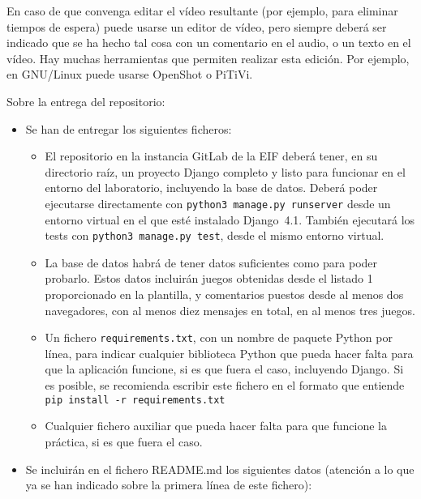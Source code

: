 \begin{enumerate}
En caso de que convenga editar el vídeo resultante (por ejemplo, para eliminar tiempos de espera) puede usarse un editor de vídeo, pero siempre deberá ser indicado que se ha hecho tal cosa con un comentario en el audio, o un texto en el vídeo. Hay muchas herramientas que permiten realizar esta edición. Por ejemplo, en GNU/Linux puede usarse OpenShot o PiTiVi.

\end{enumerate}

Sobre la entrega del repositorio:
\begin{itemize}
  \item Se han de entregar los siguientes ficheros:

\begin{itemize}
\item El repositorio en la instancia GitLab de la EIF deberá tener, en su directorio raíz, un proyecto Django completo y listo para funcionar en el entorno del laboratorio, incluyendo la base de datos. Deberá poder ejecutarse directamente con \verb|python3 manage.py runserver| desde un entorno virtual en el que esté instalado Django~4.1. También ejecutará los tests con \verb|python3 manage.py test|, desde el mismo entorno virtual.

\item La base de datos habrá de tener datos suficientes como para poder probarlo. Estos datos incluirán juegos obtenidas desde el listado 1 proporcionado en la plantilla, y comentarios puestos desde al menos dos navegadores, con al menos diez mensajes en total, en al menos tres juegos.

\item Un fichero \verb|requirements.txt|, con un nombre de paquete Python por línea, para indicar cualquier biblioteca Python que pueda hacer falta para que la aplicación funcione, si es que fuera el caso, incluyendo Django. Si es posible, se recomienda escribir este fichero en el formato que entiende \verb|pip install -r requirements.txt|

\item Cualquier fichero auxiliar que pueda hacer falta para que funcione la práctica, si es que fuera el caso.
\end{itemize}

\item Se incluirán en el fichero README.md los siguientes datos (atención a lo que ya se han indicado sobre la primera línea de este fichero):


\end{itemize}

